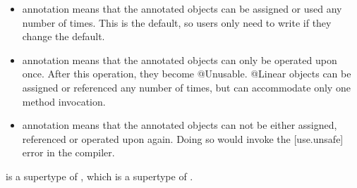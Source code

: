 \begin{itemize}
\item
{} annotation means that the annotated objects can be assigned or used any number of times.  This is the default, so users only
need to write  if they change the default.
\item
{} annotation means that the annotated objects can only be operated upon once. After this operation, they become @Unusable.
@Linear objects can be assigned or referenced any number of times, but can accommodate only one method invocation.
\item
{} annotation means that the annotated objects can not be either assigned, referenced or operated upon again.
Doing so would invoke the [use.unsafe] error in the compiler.
\end{itemize}

\noindent
{} is a supertype of , which is a
supertype of .

